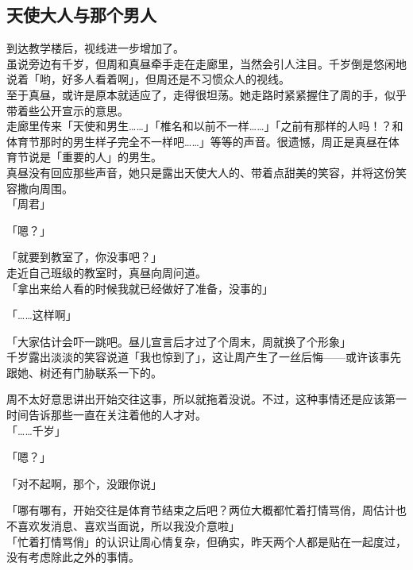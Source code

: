 \subsection{天使大人与那个男人}

到达教学楼后，视线进一步增加了。\\

虽说旁边有千岁，但周和真昼牵手走在走廊里，当然会引人注目。千岁倒是悠闲地说着「哟，好多人看着啊」，但周还是不习惯众人的视线。\\

至于真昼，或许是原本就适应了，走得很坦荡。她走路时紧紧握住了周的手，似乎带着些公开宣示的意思。\\

走廊里传来「天使和男生……」「椎名和以前不一样……」「之前有那样的人吗！？和体育节那时的男生样子完全不一样吧……」等等的声音。很遗憾，周正是真昼在体育节说是「重要的人」的男生。\\

真昼没有回应那些声音，她只是露出天使大人的、带着点甜美的笑容，并将这份笑容撒向周围。\\

「周君」

「嗯？」

「就要到教室了，你没事吧？」\\

走近自己班级的教室时，真昼向周问道。\\

「拿出来给人看的时候我就已经做好了准备，没事的」

「……这样啊」

「大家估计会吓一跳吧。昼儿宣言后才过了个周末，周就换了个形象」\\

千岁露出淡淡的笑容说道「我也惊到了」，这让周产生了一丝后悔——或许该事先跟她、树还有门胁联系一下的。

周不太好意思讲出开始交往这事，所以就拖着没说。不过，这种事情还是应该第一时间告诉那些一直在关注着他的人才对。\\

「……千岁」

「嗯？」

「对不起啊，那个，没跟你说」

「哪有哪有，开始交往是体育节结束之后吧？两位大概都忙着打情骂俏，周估计也不喜欢发消息、喜欢当面说，所以我没介意啦」\\

「忙着打情骂俏」的认识让周心情复杂，但确实，昨天两个人都是贴在一起度过，没有考虑除此之外的事情。

